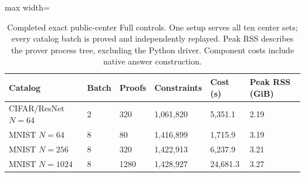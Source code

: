 \begin{table}[tp]
\caption{Completed exact public-center Full controls. One setup serves all ten center sets; every catalog batch is proved and independently replayed. Peak RSS describes the prover process tree, excluding the Python driver. Component costs include native answer construction.}\label{tab:public-full-complete}
\centering\small
\begin{adjustbox}{max width=\textwidth}
\begin{tabular}{@{}llllll@{}}
\toprule
Catalog & Batch & Proofs & Constraints & Cost (s) & Peak RSS (GiB) \\
\midrule
CIFAR/ResNet $N=64$ & 2 & 320 & 1,061,820 & 5,351.1 & 2.19 \\
MNIST $N=64$ & 8 & 80 & 1,416,899 & 1,715.9 & 3.19 \\
MNIST $N=256$ & 8 & 320 & 1,422,913 & 6,237.9 & 3.21 \\
MNIST $N=1024$ & 8 & 1280 & 1,428,927 & 24,681.3 & 3.27 \\
\bottomrule
\end{tabular}
\end{adjustbox}
\end{table}
